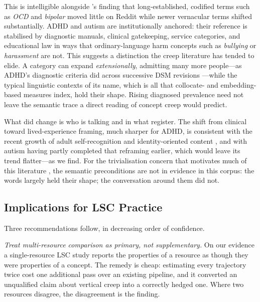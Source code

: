 \documentclass[final]{clv2025}
\begin{document}
This is intelligible alongside \citeauthor{iacobComputationalAnalysisEmergence2026}'s
\citeyear{iacobComputationalAnalysisEmergence2026} finding that long-established, codified
terms such as \emph{OCD} and \emph{bipolar} moved little on Reddit while newer vernacular
terms shifted substantially. ADHD and autism are institutionally anchored: their reference
is stabilised by diagnostic manuals, clinical gatekeeping, service categories, and
educational law in ways that ordinary-language harm concepts such as \emph{bullying} or
\emph{harassment} \citep{vylomovaSemanticChangesHarmrelated2021} are not. This suggests a
distinction the creep literature has tended to elide. A category can expand
\emph{extensionally}, admitting many more people---as ADHD's diagnostic criteria did across
successive DSM revisions \citep{fabianoDiagnosticInflationDSM2020,americanpsychiatricassociationDiagnosticStatisticalManual2013}---while
the typical linguistic contexts of its name, which is all that collocate- and
embedding-based measures index, hold their shape. Rising diagnosed prevalence
\citep{zeidanGlobalPrevalenceAutism2022,mckechnieAttentiondeficitHyperactivityDisorder2023}
need not leave the semantic trace a direct reading of concept creep would predict.

What did change is who is talking and in what register. The shift from clinical toward
lived-experience framing, much sharper for ADHD, is consistent with the recent growth of
adult self-recognition and identity-oriented content
\citep{ginappExperiencesAdultsADHD2023,alperTikTokAlgorithmicallyMediated2025,martinChangingPrevalenceADHD2025},
and with autism having partly completed that reframing earlier, which would leave its trend
flatter---as we find. For the trivialisation concern that motivates much of this literature
\citep{isern-masUnmaskingTherapyspeak2025,spencerIsntEveryoneLittle2021}, the semantic
preconditions are not in evidence in this corpus: the words largely held their shape; the
conversation around them did not.

\subsection{Implications for LSC Practice}
\label{sec:practice}

Three recommendations follow, in decreasing order of confidence.

\emph{Treat multi-resource comparison as primary, not supplementary.} On our evidence a
single-resource LSC study reports the properties of a resource as though they were
properties of a concept. The remedy is cheap: estimating every trajectory twice cost one
additional pass over an existing pipeline, and it converted an unqualified claim about
vertical creep into a correctly hedged one. Where two resources disagree, the disagreement
is the finding.
\end{document}
